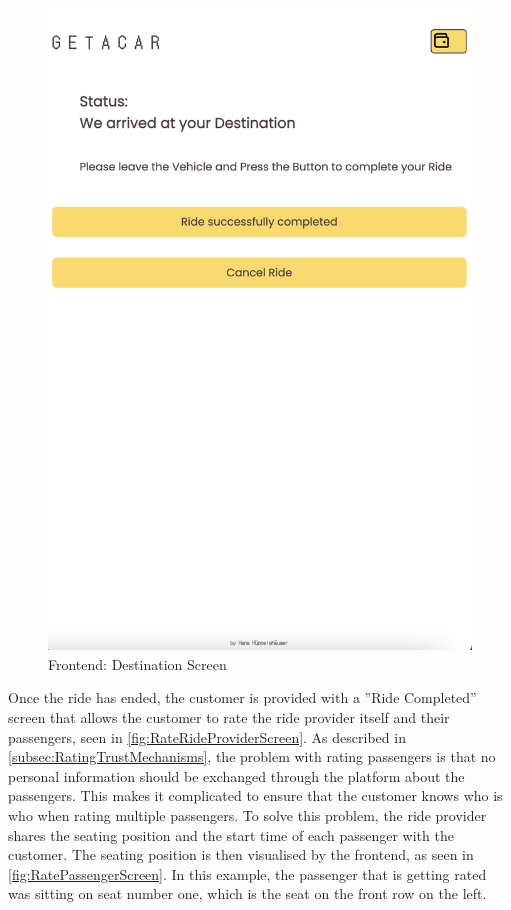 \begin{figure}[H]
\begin{minipage}{0.45\linewidth}
        \includegraphics[width=\linewidth]{data/ffss/10.png}
        \caption{Frontend: Destination Screen}
        \label{fig:DestinationScreen}
    \end{minipage}
    
\end{figure}

Once the ride has ended, the customer is provided with a ''Ride Completed'' screen that allows the customer to rate the ride provider itself and their passengers, seen in \ref{fig:RateRideProviderScreen}. As described in \ref{subsec:RatingTrustMechanisms}, the problem with rating passengers is that no personal information should be exchanged through the platform about the passengers. This makes it complicated to ensure that the customer knows who is who when rating multiple passengers. To solve this problem, the ride provider shares the seating position and the start time of each passenger with the customer. The seating position is then visualised by the frontend, as seen in \ref{fig:RatePassengerScreen}. In this example, the passenger that is getting rated was sitting on seat number one, which is the seat on the front row on the left. 



